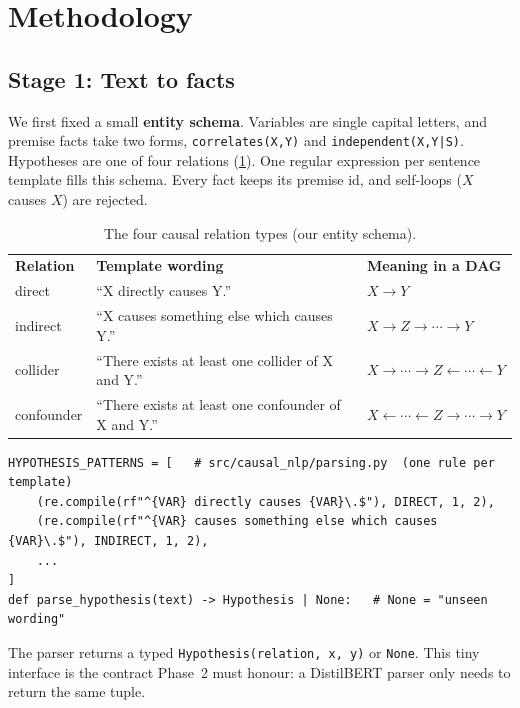 \documentclass[11pt,a4paper]{article}
\newcommand{\thead}[1]{\leavevmode\sffamily\bfseries\color{white}#1}
\newcommand{\headrow}{\rowcolor{ink}}
\newcommand{\chip}[2]{\tcbox[on line,colback=#1,colframe=#1,coltext=white,arc=2pt,boxsep=0pt,
  left=3pt,right=3pt,top=1.5pt,bottom=1.5pt,fontupper=\sffamily\bfseries\scriptsize]{#2}}
\newcommand{\LL}{\chip{neural}{LANGUAGE}}
\newcommand{\code}[1]{\texttt{\small\color{neural!80!black}#1}}
\begin{document}
\section{Methodology}\label{sec:method}

\subsection{Stage 1: Text to facts \texorpdfstring{\quad\LL}{}}
We first fixed a small \textbf{entity schema}. Variables are single capital letters, and
premise facts take two forms, \code{correlates(X,Y)} and \code{independent(X,Y|S)}. Hypotheses are one of four relations
(\cref{tab:schema}). One regular expression per sentence template fills this schema. Every fact keeps
its premise id, and self-loops ($X$ causes $X$) are rejected.

\begin{table}[!htbp]
\centering\small
\caption{The four causal relation types (our entity schema).}
\label{tab:schema}
\begin{tabular}{@{}lll@{}}
\headrow \thead{Relation} & \thead{Template wording} & \thead{Meaning in a DAG} \\
direct     & ``X directly causes Y.'' & $X\rightarrow Y$ \\
\rowcolor{mist} indirect & ``X causes something else which causes Y.'' & $X\rightarrow Z\rightarrow\cdots\rightarrow Y$ \\
collider   & ``There exists at least one collider of X and Y.'' & $X\rightarrow\cdots\rightarrow Z\leftarrow\cdots\leftarrow Y$ \\
\rowcolor{mist} confounder & ``There exists at least one confounder of X and Y.'' & $X\leftarrow\cdots\leftarrow Z\rightarrow\cdots\rightarrow Y$ \\
\end{tabular}
\end{table}

\begin{lstlisting}
HYPOTHESIS_PATTERNS = [   # src/causal_nlp/parsing.py  (one rule per template)
    (re.compile(rf"^{VAR} directly causes {VAR}\.$"), DIRECT, 1, 2),
    (re.compile(rf"^{VAR} causes something else which causes {VAR}\.$"), INDIRECT, 1, 2),
    ...
]
def parse_hypothesis(text) -> Hypothesis | None:   # None = "unseen wording"
\end{lstlisting}

The parser returns a typed \code{Hypothesis(relation, x, y)} or \code{None}. This tiny interface is the
contract Phase~2 must honour: a DistilBERT parser only needs to return the same tuple.
\end{document}
